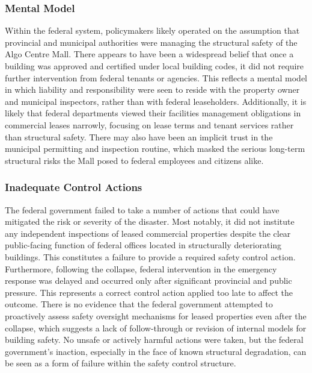 \documentclass[12pt]{article}
\begin{document}
\subsubsection*{Mental Model}

Within the federal system, policymakers likely operated on the assumption that provincial and municipal authorities were managing the structural safety of the Algo Centre Mall. There appears to have been a widespread belief that once a building was approved and certified under local building codes, it did not require further intervention from federal tenants or agencies. This reflects a mental model in which liability and responsibility were seen to reside with the property owner and municipal inspectors, rather than with federal leaseholders. Additionally, it is likely that federal departments viewed their facilities management obligations in commercial leases narrowly, focusing on lease terms and tenant services rather than structural safety. There may also have been an implicit trust in the municipal permitting and inspection routine, which masked the serious long-term structural risks the Mall posed to federal employees and citizens alike.

\subsubsection*{Inadequate Control Actions}

The federal government failed to take a number of actions that could have mitigated the risk or severity of the disaster. Most notably, it did not institute any independent inspections of leased commercial properties despite the clear public-facing function of federal offices located in structurally deteriorating buildings. This constitutes a failure to provide a required safety control action. Furthermore, following the collapse, federal intervention in the emergency response was delayed and occurred only after significant provincial and public pressure. This represents a correct control action applied too late to affect the outcome. There is no evidence that the federal government attempted to proactively assess safety oversight mechanisms for leased properties even after the collapse, which suggests a lack of follow-through or revision of internal models for building safety. No unsafe or actively harmful actions were taken, but the federal government's inaction, especially in the face of known structural degradation, can be seen as a form of failure within the safety control structure.
\end{document}
